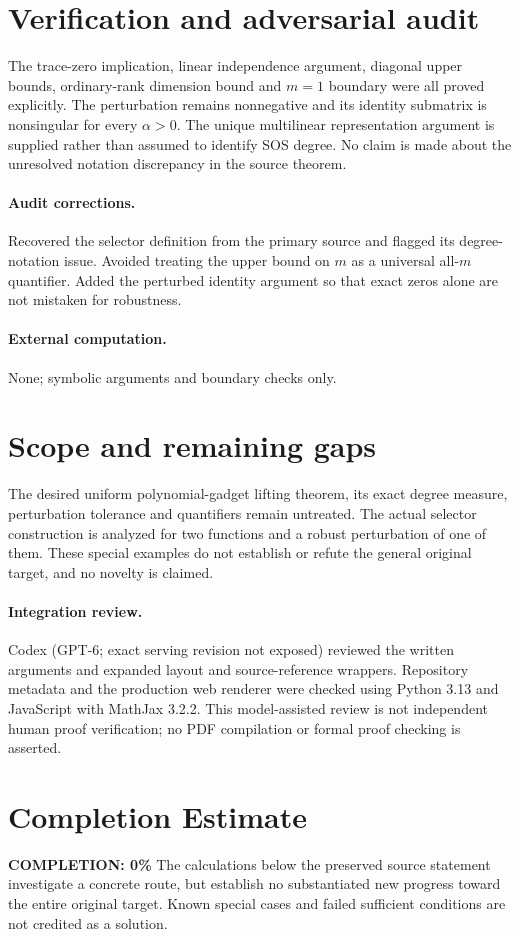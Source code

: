 \documentclass[11pt]{article}
\begin{document}
\section{Verification and adversarial audit}
The trace-zero implication, linear independence argument, diagonal upper bounds, ordinary-rank dimension bound and $m=1$ boundary were all proved explicitly. The perturbation remains nonnegative and its identity submatrix is nonsingular for every $\alpha>0$. The unique multilinear representation argument is supplied rather than assumed to identify SOS degree. No claim is made about the unresolved notation discrepancy in the source theorem.
\paragraph{Audit corrections.} Recovered the selector definition from the primary source and flagged its degree-notation issue. Avoided treating the upper bound on $m$ as a universal all-$m$ quantifier. Added the perturbed identity argument so that exact zeros alone are not mistaken for robustness.
\paragraph{External computation.} None; symbolic arguments and boundary checks only.
\section{Scope and remaining gaps}
The desired uniform polynomial-gadget lifting theorem, its exact degree measure, perturbation tolerance and quantifiers remain untreated. The actual selector construction is analyzed for two functions and a robust perturbation of one of them. These special examples do not establish or refute the general original target, and no novelty is claimed.
\paragraph{Integration review.} Codex (GPT-6; exact serving revision not exposed) reviewed the written arguments and expanded layout and source-reference wrappers. Repository metadata and the production web renderer were checked using Python 3.13 and JavaScript with MathJax 3.2.2. This model-assisted review is not independent human proof verification; no PDF compilation or formal proof checking is asserted.

\section{Completion Estimate}
\noindent\textbf{COMPLETION: 0\%}
The calculations below the preserved source statement investigate a concrete route,
but establish no substantiated new progress toward the entire original target.
Known special cases and failed sufficient conditions are not credited as a solution.
\end{document}

